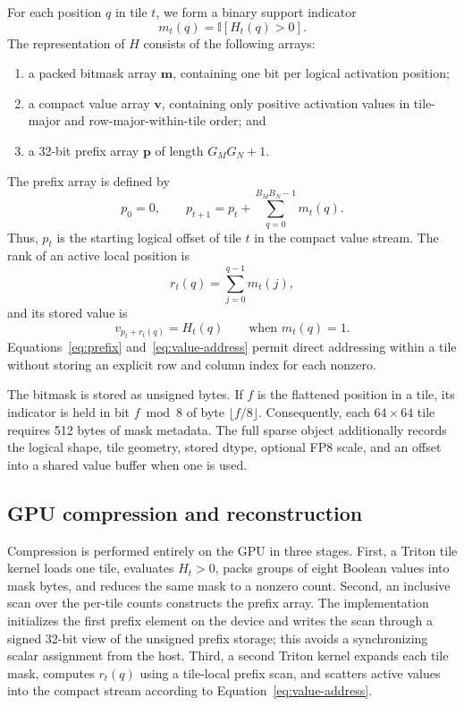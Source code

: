 For each position $q$ in tile $t$, we form a binary support indicator
\begin{equation}
    m_t(q) = \mathbb{I}[H_t(q)>0].
\end{equation}
The representation of $H$ consists of the following arrays:
\begin{enumerate}
    \item a packed bitmask array $\mathbf{m}$, containing one bit per
    logical activation position;
    \item a compact value array $\mathbf{v}$, containing only positive
    activation values in tile-major and row-major-within-tile order; and
    \item a 32-bit prefix array $\mathbf{p}$ of length $G_MG_N+1$.
\end{enumerate}
The prefix array is defined by
\begin{equation}
    p_0=0,
    \qquad
    p_{t+1}=p_t+\sum_{q=0}^{B_MB_N-1}m_t(q).
    \label{eq:prefix}
\end{equation}
Thus, $p_t$ is the starting logical offset of tile $t$ in the compact value
stream.  The rank of an active local position is
\begin{equation}
    r_t(q)=\sum_{j=0}^{q-1}m_t(j),
\end{equation}
and its stored value is
\begin{equation}
    v_{p_t+r_t(q)} = H_t(q)
    \qquad \text{when } m_t(q)=1.
    \label{eq:value-address}
\end{equation}
Equations~\eqref{eq:prefix} and~\eqref{eq:value-address} permit direct
addressing within a tile without storing an explicit row and column index for
each nonzero.

The bitmask is stored as unsigned bytes.  If $f$ is the flattened position in
a tile, its indicator is held in bit $f \bmod 8$ of byte
$\lfloor f/8 \rfloor$.  Consequently, each $64\times64$ tile requires
512 bytes of mask metadata.  The full sparse object additionally records the
logical shape, tile geometry, stored dtype, optional FP8 scale, and an offset
into a shared value buffer when one is used.

\subsection{GPU compression and reconstruction}
\label{sec:method-kernels}

Compression is performed entirely on the GPU in three stages.  First, a
Triton tile kernel loads one tile, evaluates $H_t>0$, packs groups of eight
Boolean values into mask bytes, and reduces the same mask to a nonzero count.
Second, an inclusive scan over the per-tile counts constructs the prefix
array.  The implementation initializes the first prefix element on the
device and writes the scan through a signed 32-bit view of the unsigned
prefix storage; this avoids a synchronizing scalar assignment from the host.
Third, a second Triton kernel expands each tile mask, computes
$r_t(q)$ using a tile-local prefix scan, and scatters active values into the
compact stream according to Equation~\eqref{eq:value-address}.

